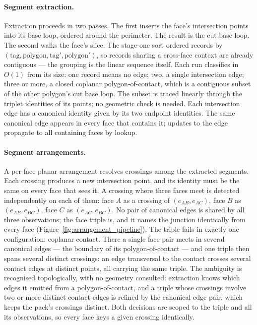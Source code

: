 \documentclass{egpubl}
\begin{document}
\paragraph*{Segment extraction.}
Extraction proceeds in two passes. The first inserts the face's intersection points into its base loop, ordered around the perimeter. The result is the cut base loop. The second walks the face's slice. The stage-one sort ordered records by $(\text{tag}, \text{polygon}, \text{tag}', \text{polygon}')$, so records sharing a cross-face context are already contiguous --- the grouping is the linear sequence itself. Each run classifies in $O(1)$ from its size: one record means no edge; two, a single intersection edge; three or more, a closed coplanar polygon-of-contact, which is a contiguous subset of the other polygon's cut base loop. The subset is traced linearly through the triplet identities of its points; no geometric check is needed. Each intersection edge has a canonical identity given by its two endpoint identities. The same canonical edge appears in every face that contains it; updates to the edge propagate to all containing faces by lookup.

\paragraph*{Segment arrangements.}
A per-face planar arrangement resolves crossings among the extracted segments. Each crossing produces a new intersection point, and its identity must be the same on every face that sees it. A crossing where three faces meet is detected independently on each of them: face $A$ as a crossing of $(e_{AB}, e_{AC})$, face $B$ as $(e_{AB}, e_{BC})$, face $C$ as $(e_{AC}, e_{BC})$. No pair of canonical edges is shared by all three observations; the face triple is, and it names the junction identically from every face (Figure~\ref{fig:arrangement_pipeline}). The triple fails in exactly one configuration: coplanar contact. There a single face pair meets in several canonical edges --- the boundary of its polygon-of-contact --- and one triple then spans several distinct crossings: an edge transversal to the contact crosses several contact edges at distinct points, all carrying the same triple. The ambiguity is recognised topologically, with no geometry consulted: extraction knows which edges it emitted from a polygon-of-contact, and a triple whose crossings involve two or more distinct contact edges is refined by the canonical edge pair, which keeps the pack's crossings distinct. Both decisions are scoped to the triple and all its observations, so every face keys a given crossing identically.
\end{document}
